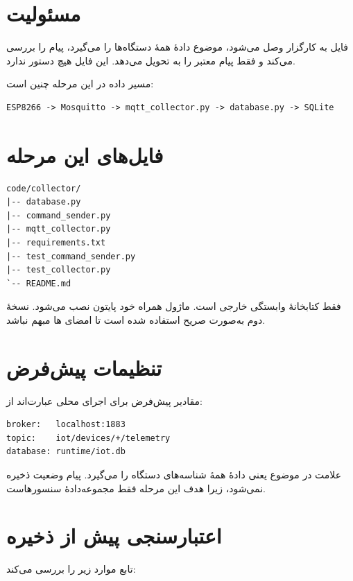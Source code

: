 \section{مسئولیت
}
فایل
به کارگزار وصل می‌شود، موضوع دادهٔ همهٔ دستگاه‌ها را می‌گیرد، پیام را بررسی می‌کند و فقط پیام معتبر را به
تحویل می‌دهد. این فایل هیچ دستور
ندارد.

مسیر داده در این مرحله چنین است:

\begin{LTR}
\begin{lstlisting}
ESP8266 -> Mosquitto -> mqtt_collector.py -> database.py -> SQLite
\end{lstlisting}
\end{LTR}

\section{فایل‌های این مرحله}
\begin{LTR}
\begin{lstlisting}
code/collector/
|-- database.py
|-- command_sender.py
|-- mqtt_collector.py
|-- requirements.txt
|-- test_command_sender.py
|-- test_collector.py
`-- README.md
\end{lstlisting}
\end{LTR}

فقط کتابخانهٔ
وابستگی خارجی است. ماژول
همراه خود پایتون نصب می‌شود. نسخهٔ دوم
به‌صورت صریح استفاده شده است تا امضای
ها مبهم نباشد.

\section{تنظیمات پیش‌فرض}
مقادیر پیش‌فرض برای اجرای محلی عبارت‌اند از:

\begin{LTR}
\begin{lstlisting}
broker:   localhost:1883
topic:    iot/devices/+/telemetry
database: runtime/iot.db
\end{lstlisting}
\end{LTR}

علامت
\lr{+}
در موضوع یعنی
دادهٔ همهٔ شناسه‌های دستگاه را می‌گیرد. پیام وضعیت ذخیره نمی‌شود، زیرا هدف این مرحله فقط مجموعه‌دادهٔ سنسورهاست.

\section{اعتبارسنجی پیش از ذخیره}
تابع
موارد زیر را بررسی می‌کند:

